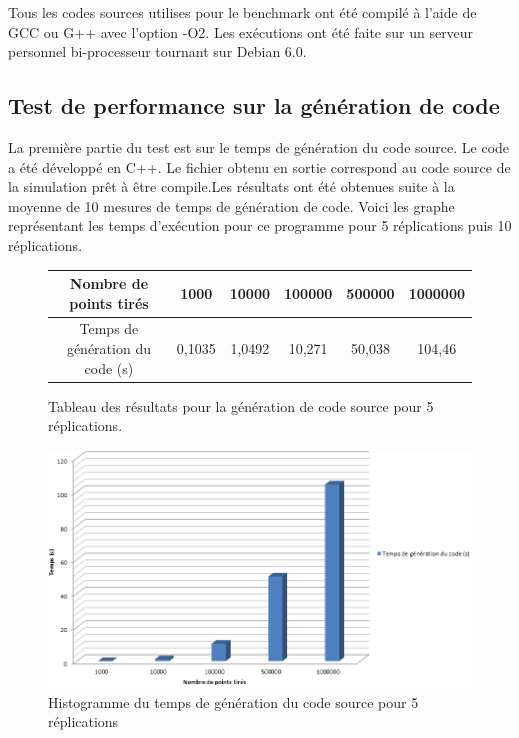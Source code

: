 \documentclass[a4paper,11pt]{report}
\begin{document}
\normalsize{
Tous les codes sources utilises pour le benchmark ont été compilé à l'aide de GCC ou G++ avec l'option -O2. Les exécutions ont été faite sur un serveur personnel bi-processeur tournant sur Debian 6.0. 
} 

\subsection{Test de performance sur la génération de code}

\normalsize{
La première partie du test est sur le temps de génération du code source. Le code a été développé en C++. Le fichier obtenu en sortie correspond au code source de la simulation prêt à être compile.Les résultats ont été obtenues suite à la moyenne de 10 mesures de temps de génération de code. Voici les graphe représentant les temps d'exécution pour ce programme pour 5 réplications puis 10 réplications.
}

\clearpage

\begin{figure}[h]
\begin{center}
\begin{tabular}{|c|c|c|c|c|c|}
\hline
Nombre de points tirés & 1000 & 10000 & 100000 & 500000 & 1000000 \\
\hline
Temps de génération du code (s) & 0,1035 & 1,0492 & 10,271 & 50,038 & 104,46 \\
\hline
\end{tabular}
\end{center}
\caption{Tableau des résultats pour la génération de code source pour 5 réplications.}
\end{figure}


\begin{figure}[h]
   \begin{center}
   \includegraphics[scale = 0.55]{grapheGenerationCode5.PNG}
   \end{center}
  \caption{Histogramme du temps de génération du code source pour 5 réplications}
\end{figure}
\end{document}
